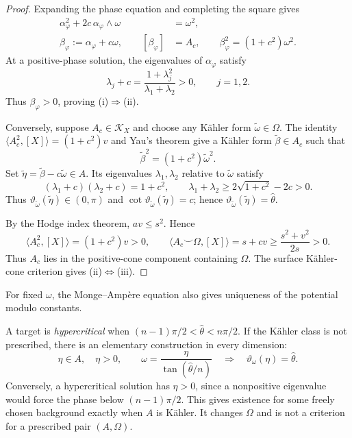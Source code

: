 \documentclass[12pt,reqno]{amsart}
\numberwithin{equation}{section}
\theoremstyle{plain}
\theoremstyle{definition}
\newcommand{\cK}{\mathcal K}
\begin{document}
\begin{proof}
Expanding the phase equation and completing the square gives
\begin{align}
 \alpha_\varphi^2+2c\,\alpha_\varphi\wedge\omega&=\omega^2,\nonumber\\
 \beta_\varphi:=\alpha_\varphi+c\omega,\qquad
 [\beta_\varphi]&=A_c,\qquad
 \beta_\varphi^2=(1+c^2)\omega^2.
 \label{surface-Monge-Ampere-equation}
\end{align}
At a positive-phase solution, the eigenvalues of $\alpha_\varphi$ satisfy
\[
 \lambda_j+c=\frac{1+\lambda_j^2}{\lambda_1+\lambda_2}>0,
 \qquad j=1,2.
\]
Thus $\beta_\varphi>0$, proving \textup{(i)}$\Rightarrow$\textup{(ii)}.

Conversely, suppose $A_c\in\cK_X$ and choose any K\"ahler form
$\widetilde\omega\in\Omega$. The identity
$\langle A_c^2,[X]\rangle=(1+c^2)v$ and Yau's theorem \cite{Yau78}
give a K\"ahler form $\widetilde\beta\in A_c$ such that
\[
 \widetilde\beta^2=(1+c^2)\widetilde\omega^2.
\]
Set $\widetilde\eta=\widetilde\beta-c\widetilde\omega\in A$.
Its eigenvalues $\lambda_1,\lambda_2$ relative to $\widetilde\omega$ satisfy
\[
 (\lambda_1+c)(\lambda_2+c)=1+c^2,\qquad
 \lambda_1+\lambda_2\geq2\sqrt{1+c^2}-2c>0.
\]
Thus $\vartheta_{\widetilde\omega}(\widetilde\eta)\in(0,\pi)$ and
$\cot\vartheta_{\widetilde\omega}(\widetilde\eta)=c$; hence
$\vartheta_{\widetilde\omega}(\widetilde\eta)=\widehat\theta$.

By the Hodge index theorem, $av\leq s^2$. Hence
\[
 \langle A_c^2,[X]\rangle=(1+c^2)v>0,\qquad
 \langle A_c\smile\Omega,[X]\rangle=s+cv
 \geq\frac{s^2+v^2}{2s}>0.
\]
Thus $A_c$ lies in the positive-cone component containing $\Omega$.
The surface K\"ahler-cone criterion \cite{DP04} gives
\textup{(ii)}$\Leftrightarrow$\textup{(iii)}.
\end{proof}
For fixed $\omega$, the Monge--Amp\`ere equation also gives uniqueness
of the potential modulo constants.

A target is \emph{hypercritical} when
$(n-1)\pi/2<\widehat\theta<n\pi/2$. If the K\"ahler class is not
prescribed, there is an elementary construction in every dimension:
\[
 \eta\in A,\quad\eta>0,\qquad
 \omega=\frac{\eta}{\tan(\widehat\theta/n)}
 \quad\Longrightarrow\quad\vartheta_\omega(\eta)=\widehat\theta.
\]
Conversely, a hypercritical solution has $\eta>0$, since a nonpositive
eigenvalue would force the phase below $(n-1)\pi/2$.
This gives existence for some freely chosen background exactly when
$A$ is K\"ahler. It changes $\Omega$ and is not a criterion for a
prescribed pair $(A,\Omega)$.
\end{document}
